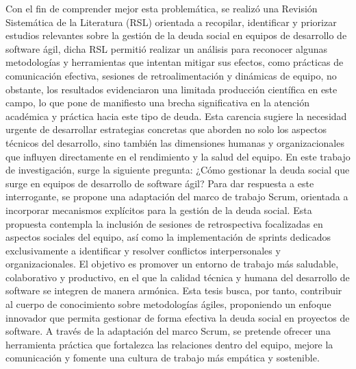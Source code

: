 Con el fin de comprender mejor esta problemática, se realizó una Revisión Sistemática de la Literatura (RSL) orientada a recopilar, identificar y priorizar estudios relevantes sobre la gestión de la deuda social en equipos de desarrollo de software ágil, dicha RSL permitió realizar un análisis para reconocer algunas metodologías y herramientas que intentan mitigar sus efectos, como prácticas de comunicación efectiva, sesiones de retroalimentación y dinámicas de equipo, no obstante, los resultados evidenciaron una limitada producción científica en este campo, lo que pone de manifiesto una brecha significativa en la atención académica y práctica hacia este tipo de deuda. Esta carencia sugiere la necesidad urgente de desarrollar estrategias concretas que aborden no solo los aspectos técnicos del desarrollo, sino también las dimensiones humanas y organizacionales que influyen directamente en el rendimiento y la salud del equipo.
En este trabajo de investigación, surge la siguiente pregunta: ¿Cómo gestionar la deuda social que surge en equipos de desarrollo de software ágil? Para dar respuesta a este interrogante, se propone una adaptación del marco de trabajo Scrum, orientada a incorporar mecanismos explícitos para la gestión de la deuda social. Esta propuesta contempla la inclusión de sesiones de retrospectiva focalizadas en aspectos sociales del equipo, así como la implementación de sprints dedicados exclusivamente a identificar y resolver conflictos interpersonales y organizacionales. El objetivo es promover un entorno de trabajo más saludable, colaborativo y productivo, en el que la calidad técnica y humana del desarrollo de software se integren de manera armónica.
Esta tesis busca, por tanto, contribuir al cuerpo de conocimiento sobre metodologías ágiles, proponiendo un enfoque innovador que permita gestionar de forma efectiva la deuda social en proyectos de software. A través de la adaptación del marco Scrum, se pretende ofrecer una herramienta práctica que fortalezca las relaciones dentro del equipo, mejore la comunicación y fomente una cultura de trabajo más empática y sostenible.
